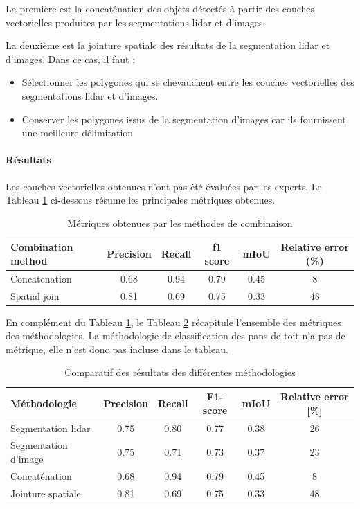 {{{{\par{La première est la concaténation des objets détectés à partir des couches vectorielles produites par les segmentations \gls{lidar} et d'images.}

\par{La deuxième est la jointure spatiale des résultats de la segmentation \gls{lidar} et d'images. Dans ce cas, il faut :}
\begin{itemize}
    \item Sélectionner les polygones qui se chevauchent entre les couches vectorielles des segmentations \gls{lidar} et d'images.
    \item Conserver les polygones issus de la segmentation d'images car ils fournissent une meilleure délimitation
\end{itemize}
\newpage
\paragraph{Résultats}

\par{Les couches vectorielles obtenues n'ont pas été évaluées par les experts. Le Tableau \ref{tab:stdl_08_ensemble_resultats} ci-dessous résume les principales métriques obtenues.}

\begin{table}[H]
    \centering
    \begin{tabular}{|l|c|c|c|c|c|}
    \hline
    Combination method & Precision & Recall & f1 score & mIoU & Relative error (\%) \\
    \hline
    Concatenation & 0.68 & 0.94 & 0.79 & 0.45 & 8 \\
    Spatial join & 0.81 & 0.69 & 0.75 & 0.33 & 48 \\
    \hline
    \end{tabular}
    \caption{Métriques obtenues par les méthodes de combinaison}
    \label{tab:stdl_08_ensemble_resultats}
\end{table}

En complément du Tableau \ref{tab:stdl_08_ensemble_resultats}, le Tableau \ref{tab:stdl_09_resultats_methodos} récapitule l'ensemble des métriques des méthodologies. La méthodologie de classification des pans de toit n'a pas de métrique, elle n'est donc pas incluse dans le tableau.

\begin{table}[H]
    \centering
    \begin{tabular}{|l|c|c|c|c|c|}
    \hline
    Méthodologie & Precision & Recall & F1-score & mIoU & Relative error [\%] \\
    \hline
    Segmentation \gls{lidar} & 0.75 & 0.80 & 0.77 & 0.38 & 26 \\
    Segmentation d'image & 0.75 & 0.71 & 0.73 & 0.37 & 23 \\
    Concaténation & 0.68 & 0.94 & 0.79 & 0.45 & 8 \\
    Jointure spatiale & 0.81 & 0.69 & 0.75 & 0.33 & 48 \\
    \hline
    \end{tabular}
    \caption{Comparatif des résultats des différentes méthodologies}
    \label{tab:stdl_09_resultats_methodos}
\end{table}

}}}}
